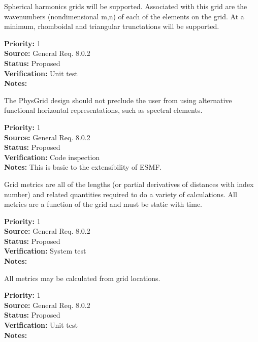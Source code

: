
Spherical harmonics grids will be supported.  Associated with this grid are the
wavenumbers (nondimensional m,n) of each of the elements on the grid.  At a
minimum, rhomboidal and triangular trunctations will be supported.
\begin{reqlist}
{\bf Priority:} 1 \\
{\bf Source:} General Req. 8.0.2 \\
{\bf Status:} Proposed \\
{\bf Verification:} Unit test\\
{\bf Notes:}
\end{reqlist}


The PhysGrid design should not preclude the user from using alternative
functional horizontal representations, such as spectral elements.

\begin{reqlist}
{\bf Priority:} 1 \\
{\bf Source:} General Req. 8.0.2 \\
{\bf Status:} Proposed \\
{\bf Verification:} Code inspection \\
{\bf Notes:} This is basic to the extensibility of ESMF.
\end{reqlist}


Grid metrics are all of the lengths (or partial derivatives of distances with
index number) and related quantities required to do a variety of calculations. 
All metrics are a function of the grid and must be static with time.
\begin{reqlist}
{\bf Priority:} 1 \\
{\bf Source:} General Req. 8.0.2 \\
{\bf Status:} Proposed \\
{\bf Verification:} System test\\
{\bf Notes:} 
\end{reqlist}

All metrics may be calculated from grid locations.
\begin{reqlist}
{\bf Priority:} 1 \\
{\bf Source:} General Req. 8.0.2 \\
{\bf Status:} Proposed \\
{\bf Verification:} Unit test\\
{\bf Notes:} 
\end{reqlist}

